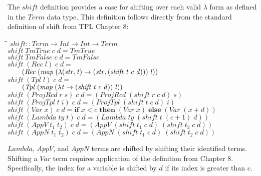 \documentclass[10pt]{article}
\newlength{\lwidth}\setlength{\lwidth}{4.5cm}
\newlength{\cwidth}\setlength{\cwidth}{8mm} %
\newcommand{\Conid}[1]{\mathit{#1}}
\newcommand{\Varid}[1]{\mathit{#1}}
\begin{document}
The \ensuremath{\Varid{shift}} definition provides a case for shifting over each
valid $\lambda$ form as defined in the \ensuremath{\Conid{Term}} data type.  This
definition follows directly from the standard definition of shift from
TPL Chapter 8:

\begin{tabbing}
\qquad\=\hspace{\lwidth}\=\hspace{\cwidth}\=\+\kill
${\Varid{shift}\mathbin{::}\Conid{Term}\to \Conid{Int}\to \Conid{Int}\to \Conid{Term}}$\\
${\Varid{shift}\;\Conid{TmTrue}\;\Varid{c}\;\Varid{d}\mathrel{=}\Conid{TmTrue}}$\\
${\Varid{shift}\;\Conid{TmFalse}\;\Varid{c}\;\Varid{d}\mathrel{=}\Conid{TmFalse}}$\\
${\Varid{shift}\;(\Conid{Rec}\;\Varid{l})\;\Varid{c}\;\Varid{d}\mathrel{=}}$\\
${\hskip2.00em\relax(\Conid{Rec}\;(\Varid{map}\;(\lambda (\Varid{str},\Varid{t})\to (\Varid{str},(\Varid{shift}\;\Varid{t}\;\Varid{c}\;\Varid{d})))\;\Varid{l}))}$\\
${\Varid{shift}\;(\Conid{Tpl}\;\Varid{l})\;\Varid{c}\;\Varid{d}\mathrel{=}}$\\
${\hskip2.00em\relax(\Conid{Tpl}\;(\Varid{map}\;(\lambda \Varid{t}\to (\Varid{shift}\;\Varid{t}\;\Varid{c}\;\Varid{d}))\;\Varid{l}))}$\\
${\Varid{shift}\;(\Conid{ProjRcd}\;\Varid{r}\;\Varid{s})\;\Varid{c}\;\Varid{d}\mathrel{=}(\Conid{ProjRcd}\;(\Varid{shift}\;\Varid{r}\;\Varid{c}\;\Varid{d})\;\Varid{s})}$\\
${\Varid{shift}\;(\Conid{ProjTpl}\;\Varid{t}\;\Varid{i})\;\Varid{c}\;\Varid{d}\mathrel{=}(\Conid{ProjTpl}\;(\Varid{shift}\;\Varid{t}\;\Varid{c}\;\Varid{d})\;\Varid{i})}$\\
${\Varid{shift}\;(\Conid{Var}\;\Varid{x})\;\Varid{c}\;\Varid{d}\mathrel{=}\mathbf{if}\;\Varid{x}\mathbin{<}\Varid{c}\;\mathbf{then}\;(\Conid{Var}\;\Varid{x})\;\mathbf{else}\;(\Conid{Var}\;(\Varid{x}\mathbin{+}\Varid{d}))}$\\
${\Varid{shift}\;(\Conid{Lambda}\;\Varid{ty}\;\Varid{t})\;\Varid{c}\;\Varid{d}\mathrel{=}(\Conid{Lambda}\;\Varid{ty}\;(\Varid{shift}\;\Varid{t}\;(\Varid{c}\mathbin{+}\mathrm{1})\;\Varid{d}))}$\\
${\Varid{shift}\;(\Conid{AppV}\;\Varid{t}_1\;\Varid{t}_2)\;\Varid{c}\;\Varid{d}\mathrel{=}(\Conid{AppV}\;(\Varid{shift}\;\Varid{t}_1\;\Varid{c}\;\Varid{d})\;(\Varid{shift}\;\Varid{t}_2\;\Varid{c}\;\Varid{d}))}$\\
${\Varid{shift}\;(\Conid{AppN}\;\Varid{t}_1\;\Varid{t}_2)\;\Varid{c}\;\Varid{d}\mathrel{=}(\Conid{AppN}\;(\Varid{shift}\;\Varid{t}_1\;\Varid{c}\;\Varid{d})\;(\Varid{shift}\;\Varid{t}_2\;\Varid{c}\;\Varid{d}))}$
\end{tabbing}
\ensuremath{\Conid{Lambda}}, \ensuremath{\Conid{AppV}}, and \ensuremath{\Conid{AppN}} terms are shifted by
shifting their identified terms.  Shifting a \ensuremath{\Conid{Var}} term
requires application of the definition from Chapter 8.  Specifically,
the index for a variable is shifted by \ensuremath{\Varid{d}} if its index is
greater than \ensuremath{\Varid{c}}.
\end{document}
